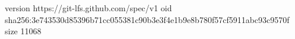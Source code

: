 version https://git-lfs.github.com/spec/v1
oid sha256:3e743530d85396b71cc055381c90b3e3f4e1b9e8b780f57cf5911abc93c9570f
size 11068
